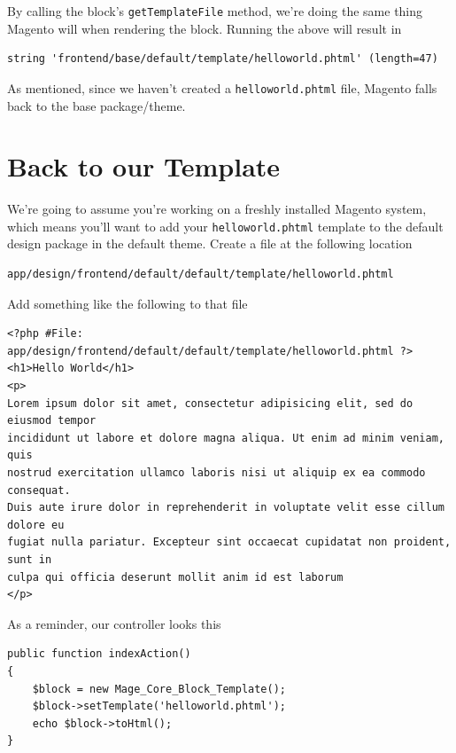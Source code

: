 \documentclass[oneside]{book}
\begin{document}
By calling the block's \footnotesize\texttt{getTemplateFile} \normalsize  method, we're doing the same thing Magento will when rendering the block.  Running the above will result in 

\begin{lstlisting}
string 'frontend/base/default/template/helloworld.phtml' (length=47)

\end{lstlisting}


As mentioned, since we haven't created a \footnotesize\texttt{helloworld.phtml} \normalsize  file, Magento falls back to the base package/theme. 

\section{Back to our Template}

We're going to assume you're working on a freshly installed Magento system, which means you'll want to add your \footnotesize\texttt{helloworld.phtml} \normalsize  template to the default design package in the default theme.  Create a file at the following location 

\begin{lstlisting}
app/design/frontend/default/default/template/helloworld.phtml

\end{lstlisting}


Add something like the following to that file

\begin{lstlisting}
<?php #File: app/design/frontend/default/default/template/helloworld.phtml ?>
<h1>Hello World</h1>
<p>
Lorem ipsum dolor sit amet, consectetur adipisicing elit, sed do eiusmod tempor
incididunt ut labore et dolore magna aliqua. Ut enim ad minim veniam, quis
nostrud exercitation ullamco laboris nisi ut aliquip ex ea commodo consequat.
Duis aute irure dolor in reprehenderit in voluptate velit esse cillum dolore eu
fugiat nulla pariatur. Excepteur sint occaecat cupidatat non proident, sunt in
culpa qui officia deserunt mollit anim id est laborum   
</p>

\end{lstlisting}


As a reminder, our controller looks this

\begin{lstlisting}
public function indexAction()
{       
    $block = new Mage_Core_Block_Template();
    $block->setTemplate('helloworld.phtml');
    echo $block->toHtml();  
}

\end{lstlisting}
\end{document}

